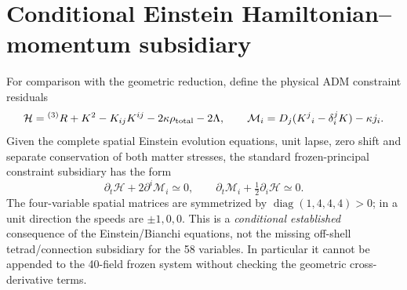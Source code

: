 \documentclass[11pt,a4paper]{article}
\newcommand{\kap}{\kappa}
\begin{document}
\section{Conditional Einstein Hamiltonian--momentum subsidiary}
For comparison with the geometric reduction, define the physical ADM constraint residuals
\[\mathcal H={}^{(3)}R+K^2-K_{ij}K^{ij}-2\kap\rho_{\rm total}-2\Lambda,
\qquad\mathcal M_i=D_j(K^j{}_i-\delta^j_iK)-\kap j_i.\]
Given the complete spatial Einstein evolution equations, unit lapse, zero shift and separate conservation of both matter stresses, the standard frozen-principal constraint subsidiary has the form
\[\partial_t\mathcal H+2\partial^i\mathcal M_i\simeq0,
\qquad\partial_t\mathcal M_i+\tfrac12\partial_i\mathcal H\simeq0.\]
The four-variable spatial matrices are symmetrized by $\operatorname{diag}(1,4,4,4)>0$; in a unit direction the speeds are $\pm1,0,0$. This is a \emph{conditional established} consequence of the Einstein/Bianchi equations, not the missing off-shell tetrad/connection subsidiary for the 58 variables. In particular it cannot be appended to the 40-field frozen system without checking the geometric cross-derivative terms.
\end{document}
